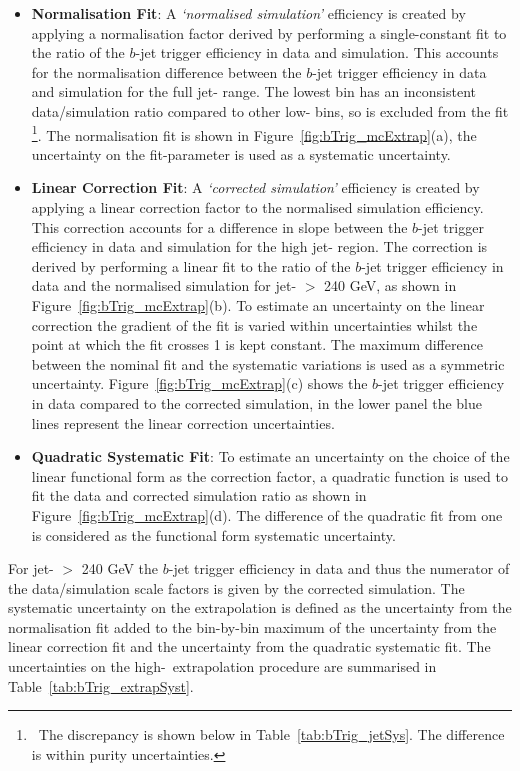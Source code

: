 \begin{itemize}[leftmargin=*]  
  \setlength\itemsep{0.5em}
\item \textbf{Normalisation Fit}: A \textit{`normalised simulation'} efficiency is created by applying
  a normalisation factor derived by performing a single-constant fit
  to the ratio of the $b$-jet trigger efficiency in data and simulation.
  This accounts for the normalisation difference between the $b$-jet trigger efficiency in data and simulation for the full jet-\pT{} range.
  The lowest \pT{} bin has an inconsistent data/simulation ratio compared to other low-\pT{} bins, so is excluded from the fit
  \footnote{\ The discrepancy is shown below in Table~\ref{tab:bTrig_jetSys}. The difference is within purity uncertainties.}.
  The normalisation fit is shown in Figure~\ref{fig:bTrig_mcExtrap}(a),
  the uncertainty on the fit-parameter is used as a systematic uncertainty.
  
\item \textbf{Linear Correction Fit}:
  A \textit{`corrected simulation'} efficiency is created by applying a linear correction factor to the normalised simulation efficiency.
  This correction accounts for a difference in slope between the $b$-jet trigger efficiency in data and simulation for the high jet-\pT{} region.
  The correction is derived by performing a linear fit to the ratio of the $b$-jet trigger efficiency in data and the normalised simulation
  for jet-\pT{} $>$ 240 GeV, as shown in Figure~\ref{fig:bTrig_mcExtrap}(b).
  To estimate an uncertainty on the linear correction the gradient of the fit is varied within uncertainties
  whilst the point at which the fit crosses 1 is kept constant.
  The maximum difference between the nominal fit and the systematic variations is used as a symmetric uncertainty.
  Figure~\ref{fig:bTrig_mcExtrap}(c) shows the $b$-jet trigger efficiency in data compared to the corrected simulation,
  in the lower panel the blue lines represent the linear correction uncertainties.
  
\item \textbf{Quadratic Systematic Fit}: 
  To estimate an uncertainty on the choice of the linear functional form as the correction factor,
  a quadratic function is used to fit the data and corrected simulation ratio
  as shown in Figure~\ref{fig:bTrig_mcExtrap}(d).
  The difference of the quadratic fit from one is considered as the functional form systematic uncertainty.
\end{itemize}

For jet-\pT{} $>$ 240 GeV the $b$-jet trigger efficiency in data and thus the numerator of the data/simulation scale factors is given by the corrected simulation.
The systematic uncertainty on the extrapolation is defined as the uncertainty from the normalisation fit
added to the bin-by-bin maximum of the uncertainty from the linear correction fit and the uncertainty from the quadratic systematic fit.
The uncertainties on the high-\pT~extrapolation procedure  are summarised in Table~\ref{tab:bTrig_extrapSyst}.

